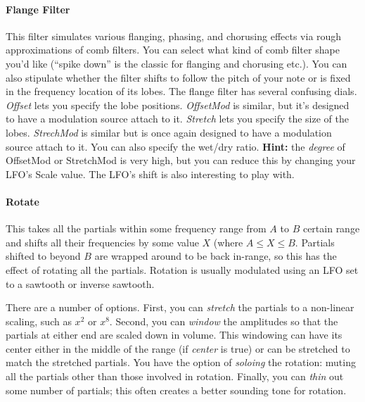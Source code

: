 \documentclass{article}
\begin{document}
\paragraph{Flange Filter} This filter simulates various flanging, phasing, and chorusing effects via rough approximations of comb filters.  You can select what kind of comb filter shape you'd like (``spike down'' is the classic for flanging and chorusing etc.).    You can also stipulate whether the filter shifts to follow the pitch of your note or is fixed in the frequency location of its lobes.    The flange filter has several confusing dials.  {\it Offset} lets you specify the lobe positions.  {\it OffsetMod} is similar, but it's designed to have a modulation source attach to it.  {\it Stretch} lets you specify the size of the lobes.  {\it StrechMod} is similar but is once again designed to have a modulation source attach to it.  You can also specify the wet/dry ratio. {\bf Hint:}  the {\it degree} of OffsetMod or StretchMod is very high, but you can reduce this by changing your LFO's Scale value.  The LFO's shift is also interesting to play with.

\paragraph{Rotate}  This takes all the partials within some frequency range from \(A\) to \(B\) certain range and shifts all their frequencies by some value \(X\) (where \(A \leq X \leq B\).  Partials shifted to beyond \(B\) are wrapped around to be back in-range, so this has the effect of rotating all the partials.  Rotation is usually modulated using an LFO set to a sawtooth or inverse sawtooth.

There are a number of options.  First, you can {\it stretch} the partials to a non-linear scaling, such as \(x^2\) or \(x^8\).  Second, you can {\it window} the amplitudes so that the partials at either end are scaled down in volume.  This windowing can have its center either in the middle of the range (if {\it center} is true) or can be stretched to match the stretched partials.  You have the option of {\it soloing} the rotation: muting all the partials other than those involved in rotation.  Finally, you can {\it thin} out some number of partials; this often creates a better sounding tone for rotation.
 
\end{document}

